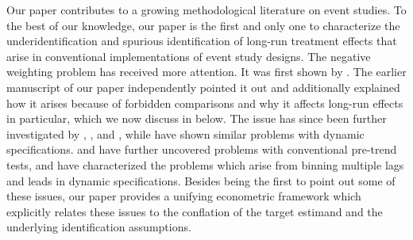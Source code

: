 \documentclass[english,11pt]{article}
\theoremstyle{plain}
\theoremstyle{plain}
\theoremstyle{plain}
\theoremstyle{plain}
\let\ref\Cref
\begin{document}
Our paper contributes to a growing methodological literature on event
studies. To the best of our knowledge, our paper is the first and
only one to characterize the underidentification and spurious identification
of long-run treatment effects that arise in conventional implementations
of event study designs. The negative weighting problem has received
more attention. It was first shown by \textcite[Supplement 1]{DeChaisemartin2015}.
The earlier manuscript of our paper \parencite{Borusyak2017} independently
pointed it out and additionally explained how it arises because of
forbidden comparisons and why it affects long-run effects in particular,
which we now discuss in \ref{subsec:Negative-Weighting} below. The
issue has since been further investigated by \textcite{Goodman-Bacon2021},
\textcite{Strezhnev2018}, and \textcite{DeChaisemartin2018}, while
\textcite{Abraham2018} have shown similar problems with dynamic specifications.
\textcite{Abraham2018} and \textcite{Roth2018a} have further uncovered
problems with conventional pre-trend tests, and \textcite{Schmidheiny2018}
have characterized the problems which arise from binning multiple
lags and leads in dynamic specifications. Besides being the first
to point out some of these issues, our paper provides a unifying econometric
framework which explicitly relates these issues to the conflation
of the target estimand and the underlying identification assumptions.
\end{document}
